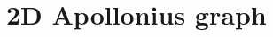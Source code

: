 
\chapter{2D Apollonius graph}
\label{chapter-apollonius2}

\vspace*{1cm}

\begin{ccTexOnly}
\minitoc
\newpage
\end{ccTexOnly}


